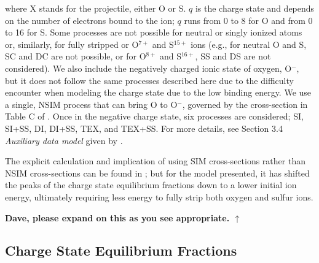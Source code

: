 \documentclass[draft]{agujournal2018}
\begin{document}
where X stands for the projectile, either O or S. $q$ is the charge state and depends on the number of electrons bound to the ion; $q$ runs from 0 to 8 for O and from 0 to 16 for S.
Some processes are not possible for neutral or singly ionized atoms or, similarly, for fully stripped or O$^{7+}$ and S$^{15+}$ ions (e.g., for neutral O and S, SC and DC are not possible, or for O$^{8+}$ and S$^{16+}$, SS and DS are not considered).
We also include the negatively charged ionic state of oxygen, O$^-$, but it does not follow the same processes described here due to the difficulty \citet{schultz2019} encounter when modeling the charge state due to the low binding energy.
We use a single, NSIM process that can bring O to O$^-$, governed by the cross-section in Table C of \citet{schultz2019}.
Once in the negative charge state, six processes are considered; SI, SI+SS, DI, DI+SS, TEX, and TEX+SS.
For more details, see Section 3.4 \textit{Auxiliary data model} given by \citet{schultz2019}.

The explicit calculation and implication of using SIM cross-sections rather than NSIM cross-sections can be found in \citet{schultz2019}; but for the model presented, it has shifted the peaks of the charge state equilibrium fractions down to a lower initial ion energy, ultimately requiring less energy to fully strip both oxygen and sulfur ions.

\noindent\textbf{\Large Dave, please expand on this as you see appropriate. $\uparrow$}

\subsection{Charge State Equilibrium Fractions}
\end{document}
